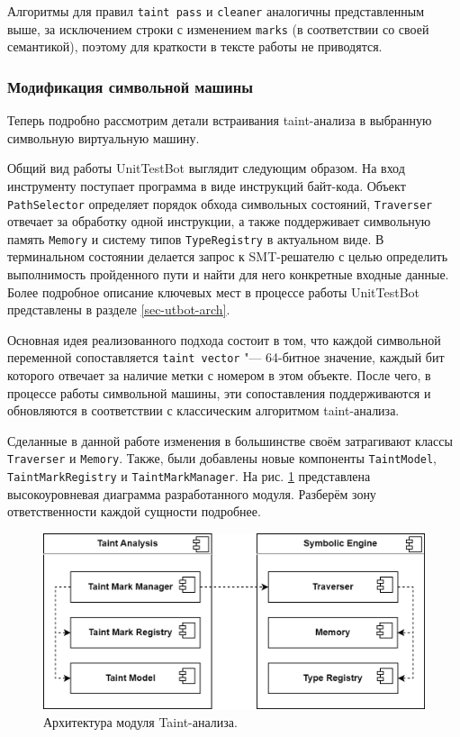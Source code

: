 Алгоритмы для правил \verb|taint pass| и \verb|cleaner| аналогичны представленным выше, за исключением строки с изменением \verb|marks| (в соответствии со своей семантикой), поэтому для краткости в тексте работы не приводятся.

\subsubsection{Модификация символьной машины}

Теперь подробно рассмотрим детали встраивания taint-анализа в выбранную символьную виртуальную машину.

Общий вид работы UnitTestBot выглядит следующим образом. На вход инструменту поступает программа в виде инструкций байт-кода. Объект \verb|PathSelector| определяет порядок обхода символьных состояний, \verb|Traverser| отвечает за обработку одной инструкции, а также поддерживает символьную память \verb|Memory| и систему типов \verb|TypeRegistry| в актуальном виде. В терминальном состоянии делается запрос к SMT-решателю с целью определить выполнимость пройденного пути и найти для него конкретные входные данные. Более подробное описание ключевых мест в процессе работы UnitTestBot представлены в разделе \ref{sec-utbot-arch}.

Основная идея реализованного подхода состоит в том, что каждой символьной переменной сопоставляется \verb|taint vector| "--- 64-битное значение, каждый бит  которого отвечает за наличие метки с номером  в этом объекте. После чего, в процессе работы символьной машины, эти сопоставления поддерживаются и обновляются в соответствии с классическим алгоритмом taint-анализа.

Сделанные в данной работе изменения в большинстве своём затрагивают классы \verb|Traverser| и \verb|Memory|. Также, были добавлены новые компоненты \verb|TaintModel|, \verb|TaintMarkRegistry| и \verb|TaintMarkManager|. На рис. \ref{taint-arch} представлена высокоуровневая диаграмма разработанного модуля. Разберём зону ответственности каждой сущности подробнее.

\begin{figure}[ht]
    \includegraphics[scale=0.35]{images/taint-arch-tr-200.png}
    \centering\caption{\label{taint-arch} Архитектура модуля Taint-анализа.}
\end{figure}

